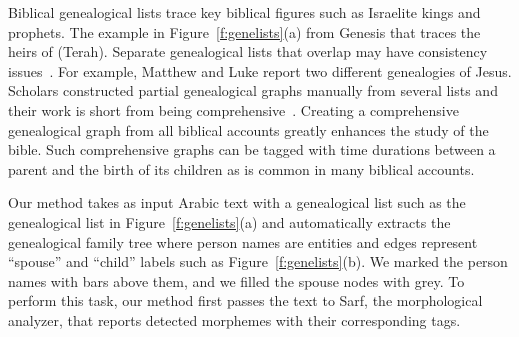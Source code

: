 \documentclass{llncs}
\newcommand{\utfRL}[1]{\setcode{utf8} \RL{#1} \setcode{standard}}
\begin{document}
%
Biblical genealogical lists 
trace key biblical figures such as 
Israelite kings and prophets.
The example in 
Figure~\ref{f:genelists}(a)
from Genesis that traces the
heirs of \utfRL{تارح} (Terah).
Separate genealogical lists that overlap may have consistency 
issues~\cite{completeBibleGenealogy:Online}. 
For example, Matthew and Luke report two different 
genealogies of Jesus. 
Scholars constructed partial genealogical graphs 
manually from several lists
and their work is short from being 
comprehensive~\cite{Belote:Online,SoulLiberty:Online}.
Creating a comprehensive genealogical graph from all biblical 
accounts greatly enhances the study of the bible. 
Such comprehensive graphs can be tagged
with time durations between a parent and the birth of 
its children as is common in many biblical accounts. 

Our method takes as input Arabic text with a genealogical
list such as the genealogical list in
Figure~\ref{f:genelists}(a) 
and automatically extracts the genealogical family tree 
where person names are entities and edges represent 
``spouse'' and ``child'' labels such as 
Figure~\ref{f:genelists}(b).
We marked the person names with bars above them, and we 
filled the spouse nodes with grey. 
To perform this task, our method first passes the text to
Sarf, the morphological analyzer, that reports detected morphemes 
with their corresponding tags. 
\end{document}
